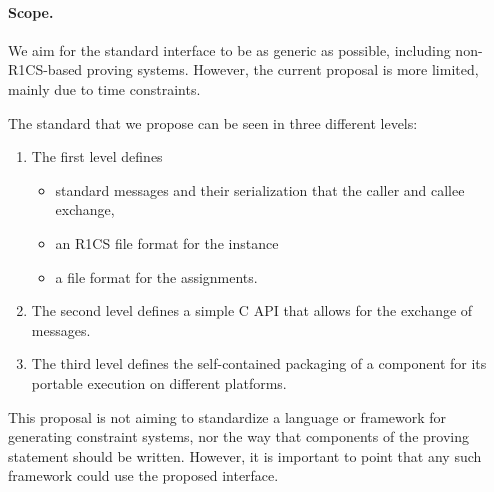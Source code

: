 \documentclass[a4paper,11pt]{article}
\begin{document}
		\paragraph{Scope.} We aim for the standard interface to be as generic as possible, including non-R1CS-based proving systems. However, the current proposal is more limited, mainly due to time constraints.
		
		The standard that we propose can be seen in three different levels:
		\begin{enumerate}
			\item The first level defines  
			\begin{itemize}
				\item standard messages and their serialization that the caller and callee exchange, 
				\item an R1CS file format for the instance
				\item a file format for the assignments.
			\end{itemize}
			\item The second level defines a simple C API that allows for the exchange of messages.
			\item The third level defines the self-contained packaging of a component for its portable execution on different platforms.
		\end{enumerate}

		This proposal is not aiming to standardize a language or framework for generating constraint systems, nor the way that components of the proving statement should be written. However, it is important to point that any such framework could use the proposed interface.
		
		

		
		
	
\end{document}
